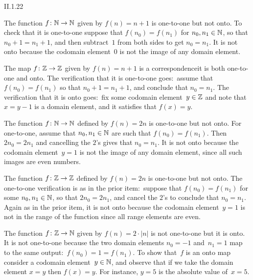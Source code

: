 \begin{ans}{II.1.22}
\begin{exparts}
\item The function $\mbox{$f\colon \mathbb{N}\to \mathbb{N}$}$ given by $f(n)=n+1$ is one-to-one
  but not onto.
  To check that it is one-to-one suppose that $f(n_0)=f(n_1)$ for
  $n_0,n_1\in\mathbb{N}$, so that $n_0+1=n_1+1$, and then
  subtract~$1$ from both sides to get $n_0=n_1$.
  It is not onto because the codomain element~$0$ is not the image of any
  domain element.
\item The map $\mbox{$f\colon \mathbb{Z}\to \mathbb{Z}$}$ given by $f(n)=n+1$ is a correspondence\Dash it
  is both one-to-one and onto.
  The verification that it is one-to-one goes:~assume that $f(n_0)=f(n_1)$
  so that $n_0+1=n_1+1$, and conclude that $n_0=n_1$.
  The verification that it is onto goes:~fix some codomain element~$y\in\mathbb{Z}$
  and note that $x=y-1$ is a domain element, and it satisfies that $f(x)=y$.
\item The function $\mbox{$f\colon \mathbb{N}\to \mathbb{N}$}$ defined by $f(n)=2n$ is one-to-one but
  not onto.
  For one-to-one, assume that $n_0,n_1\in\mathbb{N}$ are such that $f(n_0)=f(n_1)$.
  Then $2n_0=2n_1$ and cancelling the $2$'s gives that $n_0=n_1$.
  It is not onto because the codomain element~$y=1$ is not the image of
  any domain element, since all such images are even numbers.
\item The function $\mbox{$f\colon \mathbb{Z}\to \mathbb{Z}$}$ defined by $f(n)=2n$ is one-to-one but
  not onto.
  The one-to-one verification is as in the prior item:~suppose that
  $f(n_0)=f(n_1)$ for some $n_0,n_1\in\mathbb{N}$, so that
  $2n_0=2n_1$, and cancel the $2$'s to conclude that $n_0=n_1$.
  Again as in the prior item, it is not onto because the codomain element~$y=1$
  is not in the range of the function since all range elements are even.
\item The function $\mbox{$f\colon \mathbb{Z}\to \mathbb{N}$}$ given by $f(n)=2\cdot|n|$ is not
  one-to-one but it is onto.
  It is not one-to-one because the two domain elements $n_0=-1$ and~$n_1=1$
  map to the same output:~$f(n_0)=1=f(n_1)$.
  To show that~$f$ is an onto map consider a codomain element~$y\in\mathbb{N}$,
  and observe that if we take the domain element $x=y$ then $f(x)=y$.
  For instance, $y=5$ is the absolute value of~$x=5$.
\end{exparts}
\end{ans}
%
